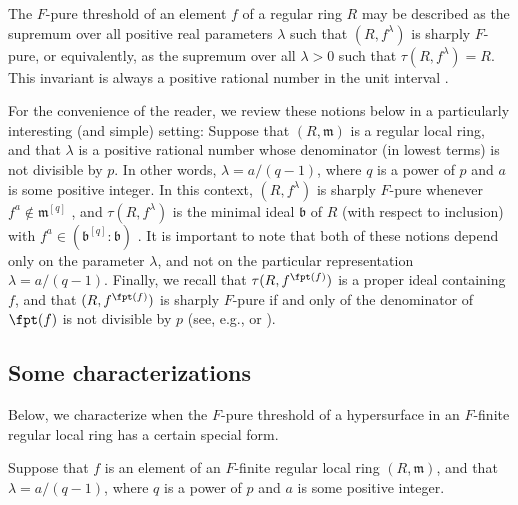\documentclass[11pt]{amsart}
\begin{document}
The $F$-pure threshold of an element $f$ of a regular ring $R$ may be described as the supremum over all positive real parameters $\lambda$ such that $(R, f^{\lambda})$ is sharply $F$-pure, or equivalently, as the supremum over all $\lambda > 0$ such that $\tau(R, f^{\lambda}) = R$.  This invariant is always a positive rational number in the unit interval \cite{BlickleMustataSmithDiscretenessAndRationalityOfFThresholds}.

For the convenience of the reader, we review these notions below in a particularly interesting (and simple) setting:  Suppose that $(R, {\mathfrak{m}})$ is a regular local ring, and that $\lambda$ is a positive rational number whose denominator (in lowest terms) is not divisible by $p$.  In other words, $\lambda = a/(q-1)$, where $q$ is a power of $p$ and $a$ is some positive integer.  In this context, $(R, f^{\lambda})$ is sharply $F$-pure whenever $f^a \notin {\mathfrak{m}}^{[q]}$  \cite[Corollary 3.4]{SchwedeSharpTestElements}, and $\tau(R, f^{\lambda})$ is the minimal ideal ${\mathfrak{b}}$ of $R$ (with respect to inclusion) with $f^a \in ({\mathfrak{b}}^{[q]} : {\mathfrak{b}})$ \cite[Theorem 6.3]{SchwedeCentersOfFPurity}.  It is important to note that both of these notions depend only on the parameter $\lambda$, and not on the particular representation $\lambda = a/(q-1)$.   Finally, we recall that $\tau(R, f^{\fpt(f)})$ is a proper ideal containing $f$, and that $(R, f^{\fpt(f)})$ is sharply $F$-pure if and only of the denominator of $\fpt(f)$ is not divisible by $p$ (see, e.g., \cite[Remark 5.5]{SchwedeSharpTestElements} or \cite[Theorem 4.1]{HernandezFPurityOfHypersurfaces}).

\subsection{Some characterizations}

Below,  we characterize when the $F$-pure threshold of a hypersurface in an $F$-finite regular local ring has a certain special form.

\begin{setup}
\label{characterization: S}  Suppose that $f$ is an element of an $F$-finite regular local ring $(R, {\mathfrak{m}})$, and that $\lambda = a/(q-1)$, where $q$ is a power of $p$ and $a$ is some positive integer.
\end{setup}
\end{document}

